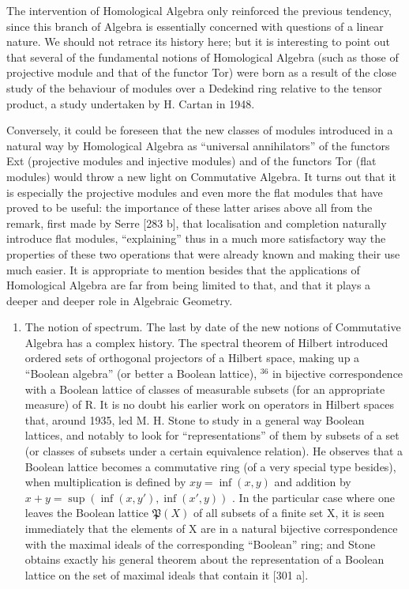 The intervention of Homological Algebra only reinforced the previous tendency, since this branch of Algebra is essentially concerned with questions of a linear nature. We should not retrace its history here; but it is interesting to point out that several of the fundamental notions of Homological Algebra (such as those of projective module and that of the functor Tor) were born as a result of the close study of the behaviour of modules over a Dedekind ring relative to the tensor product, a study undertaken by H. Cartan in 1948.

Conversely, it could be foreseen that the new classes of modules introduced in a natural way by Homological Algebra as ``universal annihilators'' of the functors Ext (projective modules and injective modules) and of the functors Tor (flat modules) would throw a new light on Commutative Algebra. It turns out that it is especially the projective modules and even more the flat modules that have proved to be useful: the importance of these latter arises above all from the remark, first made by Serre {[}283 b{]}, that localisation and completion naturally introduce flat modules, ``explaining'' thus in a much more satisfactory way the properties of these two operations that were already known and making their use much easier. It is appropriate to mention besides that the applications of Homological Algebra are far from being limited to that, and that it plays a deeper and deeper role in Algebraic Geometry.

\begin{enumerate}
\def\labelenumi{\Alph{enumi})}
\setcounter{enumi}{4}
\tightlist
\item
  The notion of spectrum. The last by date of the new notions of Commutative Algebra has a complex history. The spectral theorem of Hilbert introduced ordered sets of orthogonal projectors of a Hilbert space, making up a ``Boolean algebra'' (or better a Boolean lattice), \(^{36}\) in bijective correspondence with a Boolean lattice of classes of measurable subsets (for an appropriate measure) of R. It is no doubt his earlier work on operators in Hilbert spaces that, around 1935, led M. H. Stone to study in a general way Boolean lattices, and notably to look for ``representations'' of them by subsets of a set (or classes of subsets under a certain equivalence relation). He observes that a Boolean lattice becomes a commutative ring (of a very special type besides), when multiplication is defined by \(xy = \inf(x, y)\) and addition by \(x + y = \sup(\inf(x, y'), \inf(x', y))\) . In the particular case where one leaves the Boolean lattice \(\mathfrak{P}(X)\) of all subsets of a finite set X, it is seen immediately that the elements of X are in a natural bijective correspondence with the maximal ideals of the corresponding ``Boolean'' ring; and Stone obtains exactly his general theorem about the representation of a Boolean lattice on the set of maximal ideals that contain it {[}301 a{]}.
\end{enumerate}

